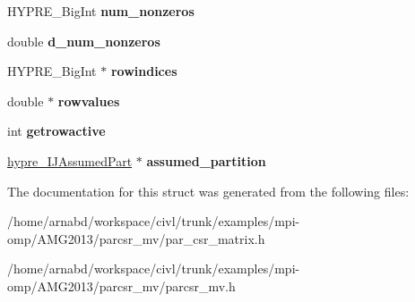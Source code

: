 \begin{DoxyCompactItemize}
\item 
\hypertarget{structhypre__ParCSRMatrix_aca5c5536a927349af328fc4dccadf70b}{}H\+Y\+P\+R\+E\+\_\+\+Big\+Int {\bfseries num\+\_\+nonzeros}\label{structhypre__ParCSRMatrix_aca5c5536a927349af328fc4dccadf70b}

\item 
\hypertarget{structhypre__ParCSRMatrix_ae64a981eac7e490ae4f751fe268a3bd0}{}double {\bfseries d\+\_\+num\+\_\+nonzeros}\label{structhypre__ParCSRMatrix_ae64a981eac7e490ae4f751fe268a3bd0}

\item 
\hypertarget{structhypre__ParCSRMatrix_ab304cef2a2067fd4ca0a015b52d434f1}{}H\+Y\+P\+R\+E\+\_\+\+Big\+Int $\ast$ {\bfseries rowindices}\label{structhypre__ParCSRMatrix_ab304cef2a2067fd4ca0a015b52d434f1}

\item 
\hypertarget{structhypre__ParCSRMatrix_a27d1581147ca271e3490a06808d10358}{}double $\ast$ {\bfseries rowvalues}\label{structhypre__ParCSRMatrix_a27d1581147ca271e3490a06808d10358}

\item 
\hypertarget{structhypre__ParCSRMatrix_ae2526cdc9ca59e2e229bfa859c6c1b80}{}int {\bfseries getrowactive}\label{structhypre__ParCSRMatrix_ae2526cdc9ca59e2e229bfa859c6c1b80}

\item 
\hypertarget{structhypre__ParCSRMatrix_a02db22b959a6af87f3c7ee70a2823310}{}\hyperlink{structhypre__IJAssumedPart}{hypre\+\_\+\+I\+J\+Assumed\+Part} $\ast$ {\bfseries assumed\+\_\+partition}\label{structhypre__ParCSRMatrix_a02db22b959a6af87f3c7ee70a2823310}

\end{DoxyCompactItemize}


The documentation for this struct was generated from the following files\+:\begin{DoxyCompactItemize}
\item 
/home/arnabd/workspace/civl/trunk/examples/mpi-\/omp/\+A\+M\+G2013/parcsr\+\_\+mv/par\+\_\+csr\+\_\+matrix.\+h\item 
/home/arnabd/workspace/civl/trunk/examples/mpi-\/omp/\+A\+M\+G2013/parcsr\+\_\+mv/parcsr\+\_\+mv.\+h\end{DoxyCompactItemize}
